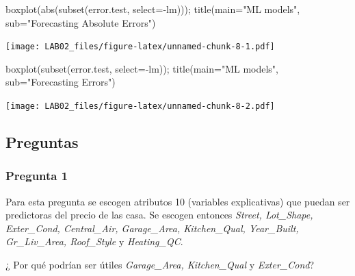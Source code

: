 \documentclass[
]{article}
\newenvironment{Shaded}{\begin{snugshade}}{\end{snugshade}}
\newcommand{\AttributeTok}[1]{\textcolor[rgb]{0.77,0.63,0.00}{#1}}
\newcommand{\FunctionTok}[1]{\textcolor[rgb]{0.00,0.00,0.00}{#1}}
\newcommand{\NormalTok}[1]{#1}
\newcommand{\SpecialCharTok}[1]{\textcolor[rgb]{0.00,0.00,0.00}{#1}}
\newcommand{\StringTok}[1]{\textcolor[rgb]{0.31,0.60,0.02}{#1}}
\begin{document}
\begin{Shaded}
\begin{Highlighting}[]
\FunctionTok{boxplot}\NormalTok{(}\FunctionTok{abs}\NormalTok{(}\FunctionTok{subset}\NormalTok{(error.test, }\AttributeTok{select=}\SpecialCharTok{{-}}\NormalTok{lm))); }\FunctionTok{title}\NormalTok{(}\AttributeTok{main=}\StringTok{"ML models"}\NormalTok{, }\AttributeTok{sub=}\StringTok{"Forecasting Absolute Errors"}\NormalTok{)}
\end{Highlighting}
\end{Shaded}

\texttt{[image: LAB02\_files/figure-latex/unnamed-chunk-8-1.pdf]}

\begin{Shaded}
\begin{Highlighting}[]
\FunctionTok{boxplot}\NormalTok{(}\FunctionTok{subset}\NormalTok{(error.test, }\AttributeTok{select=}\SpecialCharTok{{-}}\NormalTok{lm)); }\FunctionTok{title}\NormalTok{(}\AttributeTok{main=}\StringTok{"ML models"}\NormalTok{, }\AttributeTok{sub=}\StringTok{"Forecasting Errors"}\NormalTok{)}
\end{Highlighting}
\end{Shaded}

\texttt{[image: LAB02\_files/figure-latex/unnamed-chunk-8-2.pdf]}

\hypertarget{preguntas}{%
\subsection{Preguntas}\label{preguntas}}

\hypertarget{pregunta-1}{%
\subsubsection{Pregunta 1}\label{pregunta-1}}

Para esta pregunta se escogen atributos 10 (variables explicativas) que
puedan ser predictoras del precio de las casa. Se escogen entonces
\emph{Street, Lot\_Shape, Exter\_Cond, Central\_Air, Garage\_Area,
Kitchen\_Qual, Year\_Built, Gr\_Liv\_Area, Roof\_Style} y
\emph{Heating\_QC}.

¿ Por qué podrían ser útiles \emph{Garage\_Area, Kitchen\_Qual} y
\emph{Exter\_Cond}?
\end{document}
